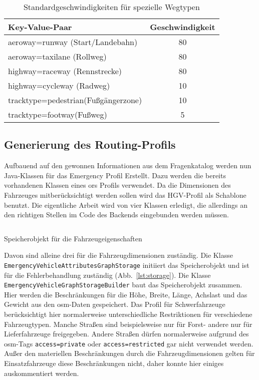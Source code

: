 \begin{table}
\caption{Standardgeschwindigkeiten für spezielle Wegtypen}
\label{tab:speedinfospecial}
\centering
\begin{tabular}{|l|c|}
\hline
\multicolumn{1}{|l|}{Key-Value-Paar} & \multicolumn{1}{c|}{Geschwindigkeit} \\
\hline
aeroway=runway (Start/Landebahn) & 80 \\
aeroway=taxilane (Rollweg) & 80 \\
highway=raceway (Rennstrecke) & 80 \\
highway=cycleway (Radweg) & 10 \\
tracktype=pedestrian(Fußgängerzone) & 10\\
tracktype=footway(Fußweg) & 5\\
\hline
\end{tabular}
\end{table}



\subsection{Generierung des Routing-Profils}
\label{backendGraphBuild}

Aufbauend auf den gewonnen Informationen aus dem Fragenkatalog werden nun Java-Klassen für das Emergency Profil Erstellt.
Dazu werden die bereits vorhandenen Klassen eines \gls{ors} Profils verwendet.
Da die Dimensionen des Fahrzeuges mitberücksichtigt werden sollen wird das HGV-Profil als Schablone benutzt.
Die eigentliche Arbeit wird von vier Klassen erledigt, die allerdings an den richtigen Stellen im Code des Backends eingebunden werden müssen.

\begin{listing}[htb]
\centering
{}
\inputminted[fontsize=\footnotesize, breaklines, breakanywhere, firstline=26, lastline=47]{java}{../data/JavaFiles/EmergencyVehicleAttributesGraphStorage.java}
\caption{Speicherobjekt für die Fahrzeugeigenschaften}
\label{lst:storage}
\end{listing}

Davon sind alleine drei für die Fahrzeugdimensionen zuständig.
Die Klasse \texttt{EmergencyVehicleAttributesGraphStorage} initiiert das Speicherobjekt und ist für die Fehlerbehandlung zuständig (Abb.~\ref{lst:storage}).
Die Klasse \texttt{EmergencyVehicleGraphStorageBuilder} baut das Speicherobjekt zusammen.
Hier werden die Beschränkungen für die Höhe, Breite, Länge, Achslast und das Gewicht aus den \gls{osm}-Daten gespeichert.
Das Profil für Schwerfahrzeuge berücksichtigt hier normalerweise unterschiedliche Restriktionen für verschiedene Fahrzeugtypen.
Manche Straßen sind beispielsweise nur für Forst- andere nur für Lieferfahrzeuge freigegeben.
Andere Straßen dürfen normalerweise aufgrund des \gls{osm}-Tags \texttt{access=private} oder \texttt{access=restricted} gar nicht verwendet werden.
Außer den materiellen Beschränkungen durch die Fahrzeugdimensionen gelten für Einsatzfahrzeuge diese Beschränkungen nicht, daher konnte hier einiges auskommentiert werden.

